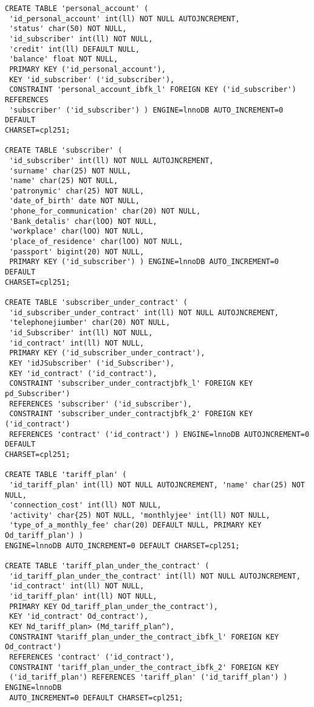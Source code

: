 \begin{verbatim}
CREATE TABLE 'personal_account' (
 'id_personal_account' int(ll) NOT NULL AUTOJNCREMENT,
 'status' char(50) NOT NULL,
 'id_subscriber' int(ll) NOT NULL,
 'credit' int(ll) DEFAULT NULL,
 'balance' float NOT NULL,
 PRIMARY KEY ('id_personal_account'),
 KEY 'id_subscriber' ('id_subscriber'),
 CONSTRAINT 'personal_account_ibfk_l' FOREIGN KEY ('id_subscriber') REFERENCES
 'subscriber' ('id_subscriber') ) ENGINE=lnnoDB AUTO_INCREMENT=0 DEFAULT
CHARSET=cpl251;

CREATE TABLE 'subscriber' (
 'id_subscriber' int(ll) NOT NULL AUTOJNCREMENT,
 'surname' char(25) NOT NULL,
 'name' char(25) NOT NULL,
 'patronymic' char(25) NOT NULL,
 'date_of_birth' date NOT NULL,
 'phone_for_communication' char(20) NOT NULL,
 'Bank_detalis' char(lOO) NOT NULL,
 'workplace' char(lOO) NOT NULL,
 'place_of_residence' char(lOO) NOT NULL,
 'passport' bigint(20) NOT NULL,
 PRIMARY KEY ('id_subscriber') ) ENGINE=lnnoDB AUTO_INCREMENT=0 DEFAULT 
CHARSET=cpl251;

CREATE TABLE 'subscriber_under_contract' (
 'id_subscriber_under_contract' int(ll) NOT NULL AUTOJNCREMENT,
 'telephonejiumber' char(20) NOT NULL,
 'id_Subscriber' int(ll) NOT NULL,
 'id_contract' int(ll) NOT NULL,
 PRIMARY KEY ('id_subscriber_under_contract'),
 KEY 'idJSubscriber' ('id_Subscriber'),
 KEY 'id_contract' ('id_contract'),
 CONSTRAINT 'subscriber_under_contractjbfk_l' FOREIGN KEY pd_Subscriber')
 REFERENCES 'subscriber' ('id_subscriber'),
 CONSTRAINT 'subscriber_under_contractjbfk_2' FOREIGN KEY ('id_contract')
 REFERENCES 'contract' ('id_contract') ) ENGINE=lnnoDB AUTOJNCREMENT=0 DEFAULT
CHARSET=cpl251;

CREATE TABLE 'tariff_plan' (
 'id_tariff_plan' int(ll) NOT NULL AUTOJNCREMENT, 'name' char(25) NOT NULL, 
 'connection_cost' int(ll) NOT NULL,
 'activity' char{25) NOT NULL, 'monthlyjee' int(ll) NOT NULL, 
 'type_of_a_monthly_fee' char(20) DEFAULT NULL, PRIMARY KEY Od_tariff_plan') ) 
ENGINE=lnnoDB AUTO_INCREMENT=0 DEFAULT CHARSET=cpl251;

CREATE TABLE 'tariff_plan_under_the_contract' (
 'id_tariff_plan_under_the_contract' int(ll) NOT NULL AUTOJNCREMENT,
 'id_contract' int(ll) NOT NULL,
 'id_tariff_plan' int(ll) NOT NULL,
 PRIMARY KEY Od_tariff_plan_under_the_contract'),
 KEY 'id_contract' Od_contract'),
 KEY Nd_tariff_plan> (Md_tariff_plan^),
 CONSTRAINT %tariff_plan_under_the_contract_ibfk_l' FOREIGN KEY Od_contract')
 REFERENCES 'contract' ('id_contract'),
 CONSTRAINT 'tariff_plan_under_the_contract_ibfk_2' FOREIGN KEY 
 ('id_tariff_plan') REFERENCES 'tariff_plan' ('id_tariff_plan') ) ENGINE=lnnoDB
 AUTO_INCREMENT=0 DEFAULT CHARSET=cpl251;
\end{verbatim}
